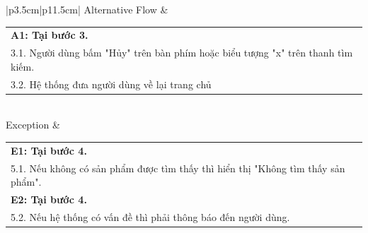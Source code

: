 \begin{enumerate}[a. ]
\begin{longtable}{|p{3.5cm}|p{11.5cm}|}
        \hline
        Alternative Flow &
          \begin{tabular}[c]{@{}p{\linewidth}} 
          \textbf{A1: Tại bước 3.}\\
           3.1. Người dùng bấm "Hủy" trên bàn phím hoặc biểu tượng "x" trên thanh tìm kiếm.\\
           3.2. Hệ thống đưa người dùng về lại trang chủ \\
        \end{tabular} \\ 
        \hline
        Exception & \begin{tabular}[c]{@{}p{\linewidth}} 
          \textbf{ E1: Tại bước 4.}\\
           5.1. Nếu không có sản phẩm được tìm thấy thì hiển thị "Không tìm thấy sản phẩm". \\
          \textbf{ E2: Tại bước 4.}\\
           5.2. Nếu hệ thống có vấn đề thì phải thông báo đến người dùng. \\
        \end{tabular} \\ \hline
    \caption{Use-case tìm kiếm sản phẩm}
    \end{longtable}
    
    \newpage


\end{enumerate}
